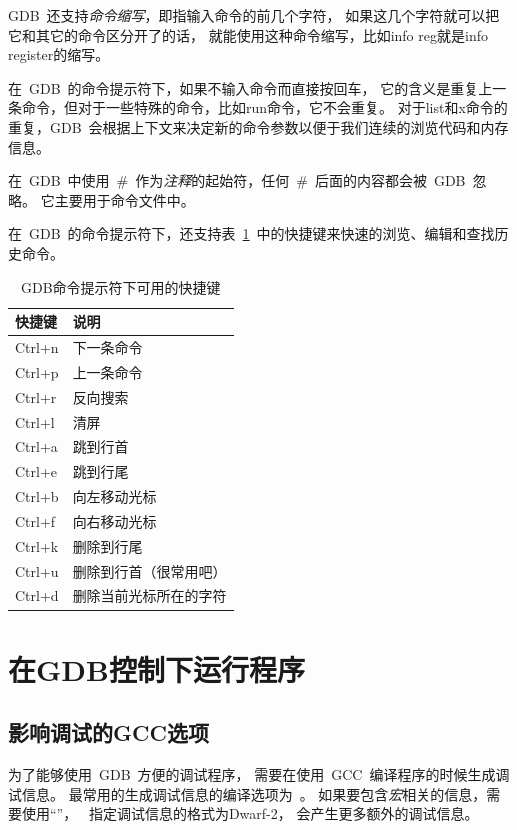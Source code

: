 GDB~还支持\emph{命令缩写}，即指输入命令的前几个字符，
如果这几个字符就可以把它和其它的命令区分开了的话，
就能使用这种命令缩写，比如info reg就是info register的缩写。

在~GDB~的命令提示符下，如果不输入命令而直接按回车，
它的含义是重复上一条命令，但对于一些特殊的命令，比如run命令，它不会重复。
对于list和x命令的重复，GDB~会根据上下文来决定新的命令参数以便于我们连续的浏览代码和内存信息。

在~GDB~中使用~\#~作为\emph{注释}的起始符，任何~\#~后面的内容都会被~GDB~忽略。
它主要用于命令文件中。

在~GDB~的命令提示符下，还支持表~\ref{tab:gdb_shortcut}~中的快捷键来快速的浏览、编辑和查找历史命令。

\begin{table}[!bhp]
\begin{tabularx}{400pt}{l|X}
\hline
\hline
快捷键  &   说明    \\
\hline
Ctrl+n  &   下一条命令  \\
Ctrl+p  &   上一条命令  \\
Ctrl+r  &   反向搜索    \\
Ctrl+l  &   清屏        \\
Ctrl+a  &   跳到行首    \\
Ctrl+e  &   跳到行尾    \\
Ctrl+b  &   向左移动光标    \\
Ctrl+f  &   向右移动光标    \\
Ctrl+k  &   删除到行尾      \\
Ctrl+u  &   删除到行首（很常用吧）      \\
Ctrl+d  &   删除当前光标所在的字符    \\
\hline
\hline
\end{tabularx}
\caption{GDB命令提示符下可用的快捷键} \label{tab:gdb_shortcut}
\end{table}


\section{在GDB控制下运行程序}
\subsection{影响调试的GCC选项}
为了能够使用~GDB~方便的调试程序，
需要在使用~GCC~编译程序的时候生成调试信息。
最常用的生成调试信息的编译选项为~。
如果要包含\emph{宏}相关的信息，需要使用“”，
~指定调试信息的格式为Dwarf-2，
会产生更多额外的调试信息。

